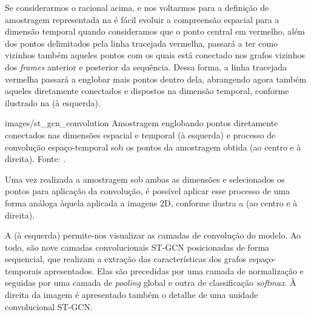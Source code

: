 Se considerarmos o racional acima, e nos voltarmos para a definição de amostragem representada na  é fácil evoluir a compreensão espacial para a dimensão temporal quando consideramos que o ponto central em vermelho, além dos pontos delimitados pela linha tracejada vermelha, passará a ter como vizinhos também aqueles pontos com os quais está conectado nos grafos vizinhos dos \textit{frames} anterior e posterior da sequência. Dessa forma, a linha tracejada vermelha passará a englobar mais pontos dentro dela, abrangendo agora também aqueles diretamente conectados e dispostos na dimensão temporal, conforme ilustrado na  (à esquerda).

    {images/st_gcn_convolution}
    {Amostragem englobando pontos diretamente conectados nas dimensões espacial e temporal (à esquerda) e processo de convolução espaço-temporal sob os pontos da amostragem obtida (ao centro e à direita).  Fonte: \cite[p. 3]{st-gcn-2018}.}

Uma vez realizada a amostragem sob ambas as dimensões e selecionados os pontos para aplicação da convolução, é possível aplicar esse processo de uma forma análoga àquela aplicada a imagens 2D, conforme ilustra a  (ao centro e à direita).



A  (à esquerda) permite-nos visualizar as camadas de convolução do modelo. Ao todo, são nove camadas convolucionais ST-GCN posicionadas de forma sequencial, que realizam a extração das características dos grafos espaço-temporais apresentados. Elas são precedidas por uma camada de normalização e seguidas por uma camada de \textit{pooling} global e outra de classificação \textit{softmax}. À direita da imagem é apresentado também o detalhe de uma unidade convolucional ST-GCN.

